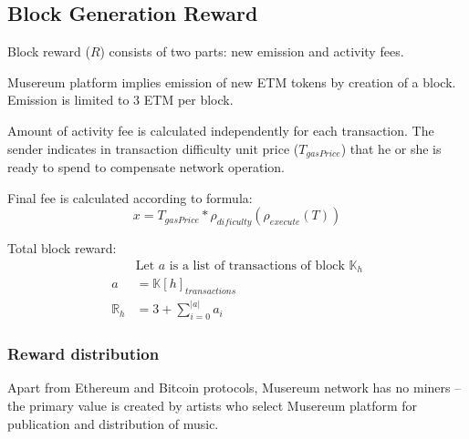 \documentclass[12pt]{report}
\begin{document}
\begin{figure}[H]
\end{figure}

\vfill\null\pagebreak

\subsection{Block Generation Reward}
\label{tech-blockchain-reward}
Block reward ($R$) consists of two parts: new emission and activity fees.

Musereum platform implies emission of new ETM tokens by creation of a block. Emission is limited to 3 ETM per block.

Amount of activity fee is calculated independently for each transaction. The sender indicates in transaction difficulty unit price ($T_{gasPrice}$) that he or she is ready to spend to compensate network operation.

Final 	fee is calculated according to formula:
\begin{equation}
x = T_{gasPrice} * \rho_{dificulty}(\rho_{execute}(T))
\end{equation}

Total block reward:
\begin{align}
&\text{Let } a \text{ is a list of transactions of block } \mathbb{K}_h \\
a &= \mathbb{K}[h]_{transactions} \\
\mathbb{R}_h &= 3 + \sum\limits_{i=0}^{|a|} a_i
\end{align}

\subsubsection{Reward distribution}
\label{tech-blockchain-reward-distribution}
Apart from Ethereum and Bitcoin protocols, Musereum network has no miners – the primary value is created by artists who select Musereum platform for publication and distribution of music.
\end{document}
